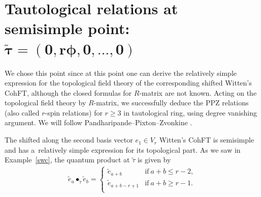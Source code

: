 \documentclass[10pt,a4paper]{amsart}
\numberwithin{equation}{section}
\begin{document}
\section[Tautological relations at semisimple point]{Tautological relations at semisimple point:\\ $\boldsymbol{\widetilde{\tau} = (0, r \phi, 0,\ldots, 0)}$}\label{tautrel}

We chose this point since at this point
one can derive the relatively simple expression for the topological field theory of the corresponding shifted Witten's CohFT, although the closed formulas for $R$-matrix are not known. Acting on the topological field theory by $R$-matrix, we successfully deduce the PPZ relations (also called $r$-spin relations)
 for $r\geq3$ in tautological ring, using degree vanishing argument. We will follow Pandharipande--Pixton--Zvonkine \cite{PPZ16}.

The shifted along the second basis vector $e_{1}\in V_r$ Witten's CohFT is
semisimple and has a~relatively simple expression for its topological part.
As we saw in Example~\ref{swc},
the quantum product at $\widetilde{\tau}$ is given by
\begin{align*}
\widetilde{e}_a \bullet_{\widetilde{\tau}}\widetilde{e}_b =
\begin{cases}
\widetilde{e}_{a+b} & \text{if} \ a+b \leq r-2 ,\\
\widetilde{e}_{a+b-r+1} & \text{if} \ a+b \geq r-1 .\\
\end{cases}
\end{align*}
\end{document}
